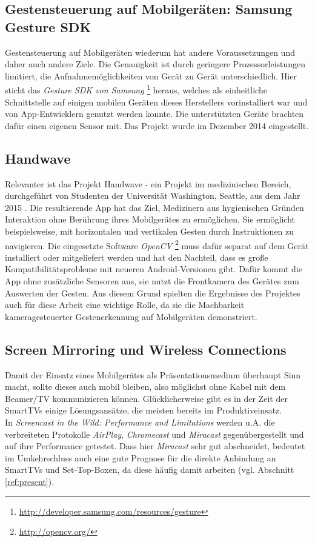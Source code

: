 \documentclass{article}
\begin{document}
\subsection{Gestensteuerung auf Mobilgeräten: Samsung Gesture SDK}
Gestensteuerung auf Mobilgeräten wiederum hat andere Voraussetzungen und daher auch andere Ziele. Die Genauigkeit ist durch geringere Prozessorleistungen limitiert, die Aufnahmemöglichkeiten von Gerät zu Gerät unterschiedlich.
Hier sticht das \textit{Gesture SDK von Samsung} \footnote{\url{http://developer.samsung.com/resources/gesture}} heraus, welches als einheitliche Schnittstelle auf einigen mobilen Geräten dieses Herstellers vorinstalliert war und von App-Entwicklern genutzt werden konnte. Die unterstützten Geräte brachten dafür einen eigenen Sensor mit. Das Projekt wurde im Dezember 2014 eingestellt.
\subsection{Handwave}
Relevanter ist das Projekt Handwave - ein Projekt im medizinischen Bereich, durchgeführt von Studenten der Universität Washington, Seattle, aus dem Jahr 2015 \cite{Dell15}. Die resultierende App hat das Ziel, Medizinern aus hygienischen Gründen Interaktion ohne Berührung ihres Mobilgerätes zu ermöglichen. Sie ermöglicht beispielsweise, mit horizontalen und vertikalen Gesten durch Instruktionen zu navigieren. Die eingesetzte Software \textit{OpenCV} \footnote{\url{http://opencv.org/}} muss dafür separat auf dem Gerät installiert oder mitgeliefert werden und hat den Nachteil, dass es große Kompatibilitätsprobleme mit neueren Android-Versionen gibt. Dafür kommt die App ohne zusätzliche Sensoren aus, sie nutzt die Frontkamera des Gerätes zum Auswerten der Gesten. Aus diesem Grund spielten die Ergebnisse des Projektes auch für diese Arbeit eine wichtige Rolle, da sie die Machbarkeit kameragesteuerter Gestenerkennung auf Mobilgeräten demonstriert.
\subsection{Screen Mirroring und Wireless Connections}
Damit der Einsatz eines Mobilgerätes als Präsentationsmedium überhaupt Sinn macht, sollte dieses auch mobil bleiben, also möglichst ohne Kabel mit dem Beamer/TV kommunizieren können. Glücklicherweise gibt es in der Zeit der SmartTVs einige Lösungsansätze, die meisten bereits im Produktiveinsatz.\\
In \textit{Screencast in the Wild: Performance and Limitations} \cite{Hsu14} werden u.A. die verbreiteten Protokolle \textit{AirPlay}, \textit{Chromecast} und \textit{Miracast} gegenübergestellt und auf ihre Performance getestet. Dass hier \textit{Miracast} sehr gut abschneidet, bedeutet im Umkehrschluss auch eine gute Prognose für die direkte Anbindung an SmartTVs und Set-Top-Boxen, da diese häufig damit arbeiten (vgl. Abschnitt \ref{ref:present}).
\end{document}
